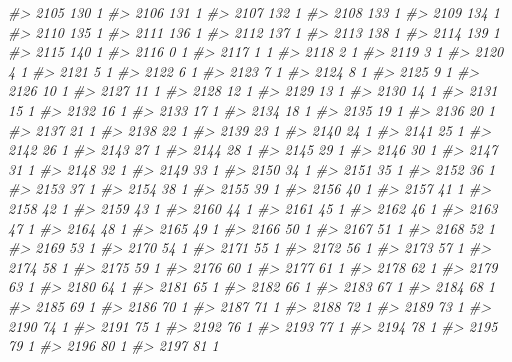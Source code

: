 \documentclass[]{article}
\newenvironment{Shaded}{\begin{snugshade}}{\end{snugshade}}
\newcommand{\CommentTok}[1]{\textcolor[rgb]{0.56,0.35,0.01}{\textit{#1}}}
\begin{document}
\begin{Shaded}
\begin{Highlighting}[]
\CommentTok{#> 2105 130  1}
\CommentTok{#> 2106 131  1}
\CommentTok{#> 2107 132  1}
\CommentTok{#> 2108 133  1}
\CommentTok{#> 2109 134  1}
\CommentTok{#> 2110 135  1}
\CommentTok{#> 2111 136  1}
\CommentTok{#> 2112 137  1}
\CommentTok{#> 2113 138  1}
\CommentTok{#> 2114 139  1}
\CommentTok{#> 2115 140  1}
\CommentTok{#> 2116   0  1}
\CommentTok{#> 2117   1  1}
\CommentTok{#> 2118   2  1}
\CommentTok{#> 2119   3  1}
\CommentTok{#> 2120   4  1}
\CommentTok{#> 2121   5  1}
\CommentTok{#> 2122   6  1}
\CommentTok{#> 2123   7  1}
\CommentTok{#> 2124   8  1}
\CommentTok{#> 2125   9  1}
\CommentTok{#> 2126  10  1}
\CommentTok{#> 2127  11  1}
\CommentTok{#> 2128  12  1}
\CommentTok{#> 2129  13  1}
\CommentTok{#> 2130  14  1}
\CommentTok{#> 2131  15  1}
\CommentTok{#> 2132  16  1}
\CommentTok{#> 2133  17  1}
\CommentTok{#> 2134  18  1}
\CommentTok{#> 2135  19  1}
\CommentTok{#> 2136  20  1}
\CommentTok{#> 2137  21  1}
\CommentTok{#> 2138  22  1}
\CommentTok{#> 2139  23  1}
\CommentTok{#> 2140  24  1}
\CommentTok{#> 2141  25  1}
\CommentTok{#> 2142  26  1}
\CommentTok{#> 2143  27  1}
\CommentTok{#> 2144  28  1}
\CommentTok{#> 2145  29  1}
\CommentTok{#> 2146  30  1}
\CommentTok{#> 2147  31  1}
\CommentTok{#> 2148  32  1}
\CommentTok{#> 2149  33  1}
\CommentTok{#> 2150  34  1}
\CommentTok{#> 2151  35  1}
\CommentTok{#> 2152  36  1}
\CommentTok{#> 2153  37  1}
\CommentTok{#> 2154  38  1}
\CommentTok{#> 2155  39  1}
\CommentTok{#> 2156  40  1}
\CommentTok{#> 2157  41  1}
\CommentTok{#> 2158  42  1}
\CommentTok{#> 2159  43  1}
\CommentTok{#> 2160  44  1}
\CommentTok{#> 2161  45  1}
\CommentTok{#> 2162  46  1}
\CommentTok{#> 2163  47  1}
\CommentTok{#> 2164  48  1}
\CommentTok{#> 2165  49  1}
\CommentTok{#> 2166  50  1}
\CommentTok{#> 2167  51  1}
\CommentTok{#> 2168  52  1}
\CommentTok{#> 2169  53  1}
\CommentTok{#> 2170  54  1}
\CommentTok{#> 2171  55  1}
\CommentTok{#> 2172  56  1}
\CommentTok{#> 2173  57  1}
\CommentTok{#> 2174  58  1}
\CommentTok{#> 2175  59  1}
\CommentTok{#> 2176  60  1}
\CommentTok{#> 2177  61  1}
\CommentTok{#> 2178  62  1}
\CommentTok{#> 2179  63  1}
\CommentTok{#> 2180  64  1}
\CommentTok{#> 2181  65  1}
\CommentTok{#> 2182  66  1}
\CommentTok{#> 2183  67  1}
\CommentTok{#> 2184  68  1}
\CommentTok{#> 2185  69  1}
\CommentTok{#> 2186  70  1}
\CommentTok{#> 2187  71  1}
\CommentTok{#> 2188  72  1}
\CommentTok{#> 2189  73  1}
\CommentTok{#> 2190  74  1}
\CommentTok{#> 2191  75  1}
\CommentTok{#> 2192  76  1}
\CommentTok{#> 2193  77  1}
\CommentTok{#> 2194  78  1}
\CommentTok{#> 2195  79  1}
\CommentTok{#> 2196  80  1}
\CommentTok{#> 2197  81  1}

\end{Highlighting}
\end{Shaded}
\end{document}
